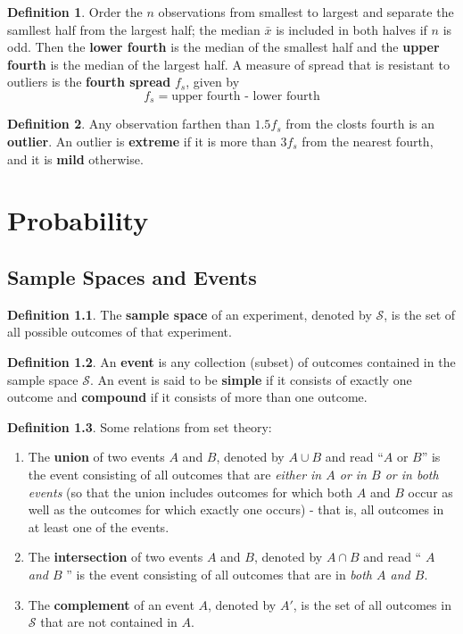 \documentclass[a4paper]{report}
\theoremstyle{definition}
\newtheorem{definition}{Definition}
\theoremstyle{plain}
\begin{document}
\begin{definition}
  Order the $n$ observations from smallest to largest and separate the samllest
  half from the largest half; the median $\bar{x}$ is included in both halves
  if $n$ is odd. Then the \textbf{lower fourth} is the median of the smallest
  half and the \textbf{upper fourth} is the median of the largest half. A
  measure of spread that is resistant to outliers is the \textbf{fourth spread}
  $f_s$, given by
  \begin{equation*}
    f_s = \text{upper fourth - lower fourth}
  \end{equation*}
\end{definition}

\begin{definition}
  Any observation farthen than $1.5f_s$ from the closts fourth is an \textbf{outlier}. An outlier is \textbf{extreme} if it is more than $3f_s$ from the nearest
  fourth, and it is \textbf{mild} otherwise.
\end{definition}
\chapter{Probability}

\section{Sample Spaces and Events}
\begin{definition} 
  The \textbf{sample space} of an experiment, denoted by $\mathcal{S}$,
  is the set of all possible outcomes of that experiment.
\end{definition}

\begin{definition}
  An \textbf{event} is any collection (subset) of outcomes contained in
  the sample space $\mathcal{S}$. An event is said to be \textbf{simple}
  if it consists of exactly one outcome and \textbf{compound} if it
  consists of more than one outcome.
\end{definition}

\begin{definition}
  Some relations from set theory:
  \begin{enumerate}
    \item The \textbf{union} of two events $A$ and $B$, denoted by $A\cup B$ and
      read ``$A$ or $B$'' is the event consisting of all outcomes that are
      \textit{either in $A$ or in $B$ or in both events} (so that the union
      includes outcomes for which both $A$ and $B$ occur as well as the outcomes
      for which exactly one occurs) - that is, all outcomes in at least one of
      the events.
    \item The \textbf{intersection} of two events $A$ and $B$, denoted by $A \cap
      B$ and read `` \textit{$A$ and $B$} '' is the event consisting of all
      outcomes that are in \textit{both $A$ and $B$}.
    \item The \textbf{complement} of an event $A$, denoted by $A'$, is the set of
      all outcomes in $\mathcal{S}$ that are not contained in $A$.
  \end{enumerate}
\end{definition}
\end{document}
